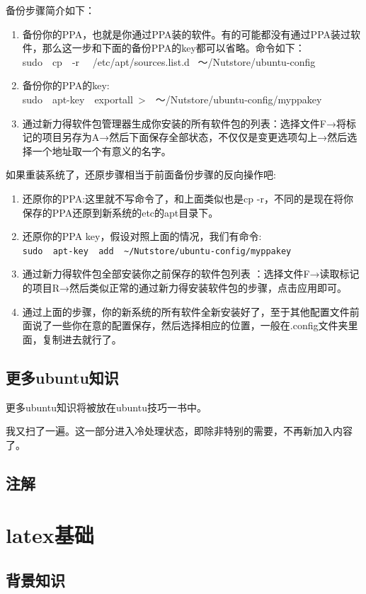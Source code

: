 \documentclass[11pt,oneside]{book}
\begin{document}
\begin{common-format}
备份步骤简介如下：
\begin{enumerate}
\item 备份你的PPA，也就是你通过PPA装的软件。有的可能都没有通过PPA装过软件，那么这一步和下面的备份PPA的key都可以省略。命令如下：\\
sudo~~cp~~-r ~~/etc/apt/sources.list.d~ ～/Nutstore/ubuntu-config
\item 备份你的PPA的key:\\
sudo~~apt-key~~exportall~>~~～/Nutstore/ubuntu-config/myppakey
\item 通过新力得软件包管理器生成你安装的所有软件包的列表：选择文件F→将标记的项目另存为A→然后下面保存全部状态，不仅仅是变更选项勾上→然后选择一个地址取一个有意义的名字。
\end{enumerate}

如果重装系统了，还原步骤相当于前面备份步骤的反向操作吧:
\begin{enumerate}
\item 还原你的PPA:这里就不写命令了，和上面类似也是cp   -r，不同的是现在将你保存的PPA还原到新系统的etc的apt目录下。
\item 还原你的PPA key，假设对照上面的情况，我们有命令:\\
\verb+sudo  apt-key  add  ~/Nutstore/ubuntu-config/myppakey+
\item 通过新力得软件包全部安装你之前保存的软件包列表 ：选择文件F→读取标记的项目R→然后类似正常的通过新力得安装软件包的步骤，点击应用即可。
\item 通过上面的步骤，你的新系统的所有软件全新安装好了，至于其他配置文件前面说了一些你在意的配置保存，然后选择相应的位置，一般在.config文件夹里面，复制进去就行了。
\end{enumerate}


\section{更多ubuntu知识}
更多ubuntu知识将被放在ubuntu技巧一书中。

我又扫了一遍。这一部分进入冷处理状态，即除非特别的需要，不再新加入内容了。


\section{注解}
\showendnotes


\chapter{latex基础}
\section{背景知识}

\end{common-format}
\end{document}
